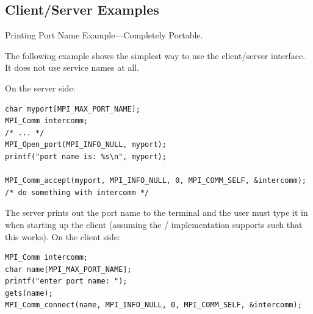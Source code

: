 \subsection{Client/Server Examples}
\label{subsec:csexamples}

\begin{example}
%
Printing Port Name Example---Completely Portable.

\noindent
The following example shows the simplest way to use
the client/server interface. It does not use service
names at all.

\noindent
On the server side:
\begin{lstlisting}[language={[MPI]C}]
char myport[MPI_MAX_PORT_NAME];
MPI_Comm intercomm;
/* ... */
MPI_Open_port(MPI_INFO_NULL, myport);
printf("port name is: %s\n", myport);

MPI_Comm_accept(myport, MPI_INFO_NULL, 0, MPI_COMM_SELF, &intercomm);
/* do something with intercomm */
\end{lstlisting}
The server prints out the port name to the terminal and the user
must type it in when starting up the client (assuming the \MPI/
implementation supports  such that this works).
On the client side:
\begin{lstlisting}[language={[MPI]C}]
MPI_Comm intercomm;
char name[MPI_MAX_PORT_NAME];
printf("enter port name: ");
gets(name);
MPI_Comm_connect(name, MPI_INFO_NULL, 0, MPI_COMM_SELF, &intercomm);
\end{lstlisting}
\end{example}

